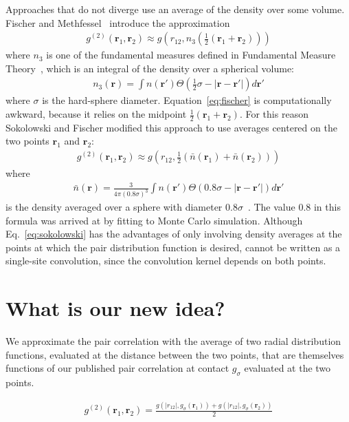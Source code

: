 \documentclass[letterpaper,twocolumn,amsmath,amssymb,pre,aps,10pt]{revtex4-1}
\newcommand{\rr}{\textbf{r}}
\begin{document}
Approaches that do not diverge use an average of the density over some
volume. Fischer and Methfessel~\cite{fischer1980born} introduce the
approximation
\begin{align}
  g^{(2)}(\rr_1,\rr_2) \approx g\left(r_{12}, n_3\left(\tfrac12
  (\rr_1+\rr_2)\right)\right)
  \label{eq:fischer}
\end{align}
where $n_3$ is one of the fundamental measures defined in Fundamental
Measure Theory~\cite{rosenfeld1989free}, which is an integral of the
density over a spherical volume:
\begin{align}
  n_3(\rr) = \int n(\rr')\Theta(\tfrac12 \sigma - |\rr-\rr'|) d\rr'
\end{align}
where $\sigma$ is the hard-sphere diameter.  Equation~\ref{eq:fischer}
is computationally awkward, because it relies on the midpoint
$\tfrac12(\rr_1+\rr_2)$.  For this reason Sokolowski and Fischer
modified this approach to use averages centered on the two points
$\rr_1$ and $\rr_2$:
\begin{align}
  g^{(2)}(\rr_1,\rr_2) \approx g\left(r_{12},
  \tfrac12(\bar{n}(\rr_1)+\bar{n}(\rr_2))\right)
  \label{eq:sokolowski}
\end{align}
where
\begin{align}
  \bar{n}(\rr) = \frac{3}{4\pi (0.8\sigma)^3}\int n(\rr')\Theta(0.8\sigma - |\rr-\rr'|) d\rr'
\end{align}
is the density averaged over a sphere with diameter
$0.8\sigma$~\cite{sokolowski1992role}.  The value 0.8 in this formula
was arrived at by fitting to Monte Carlo simulation.  Although
Eq.~\ref{eq:sokolowski} has the advantages of only involving density
averages at the points at which the pair distribution function is
desired, cannot be written as a single-site convolution, since the
convolution kernel depends on both points.



\section{What is our new idea?}
We approximate the pair correlation with the average of two radial
distribution functions, evaluated at the distance between the two
points, that are themselves functions of our published pair
correlation at contact $g_{\sigma}$ evaluated at the two points.

\begin{align}
  g^{(2)}(\rr_1,\rr_2) = \frac{g(|r_{12}|, g_\sigma(\rr_1)) + g(|r_{12}|, g_\sigma(\rr_2))}{2}
\end{align}
\end{document}
